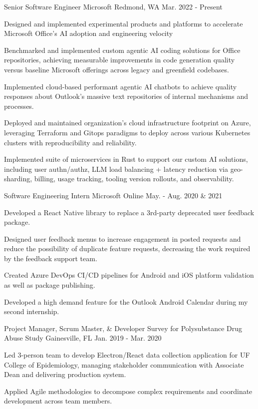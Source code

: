 \begin{cventries}
  \cventry
    {Senior Software Engineer}
    {Microsoft}
    {Redmond, WA}
    {Mar. 2022 - Present}
    {
      \begin{cvitems}
        \item{Designed and implemented experimental products and platforms to accelerate Microsoft Office's AI adoption and engineering velocity}
        \item{Benchmarked and implemented custom agentic AI coding solutions for Office repositories, achieving measurable improvements in code generation quality versus baseline Microsoft offerings across legacy and greenfield codebases.}
        \item{Implemented cloud-based performant agentic AI chatbots to achieve quality responses about Outlook's massive text repositories of internal mechanisms and processes.}
        \item{Deployed and maintained organization's cloud infrastructure footprint on Azure, leveraging Terraform and Gitops paradigms to deploy across various Kubernetes clusters with reproducibility and reliability.}
        \item{Implemented suite of microservices in Rust to support our custom AI solutions, including user authn/authz, LLM load balancing + latency reduction via geo-sharding, billing, usage tracking, tooling version rollouts, and observability.}
      \end{cvitems}
    }
  \cventry
    {Software Engineering Intern}
    {Microsoft}
    {Online}
    {May. - Aug. 2020 \& 2021}
    {
      \begin{cvitems}
        \item{Developed a React Native library to replace a 3rd-party deprecated user feedback package.}
        \item{Designed user feedback menus to increase engagement in posted requests and reduce the possibility of duplicate feature requests, decreasing the work required by the feedback support team.}
        \item{Created Azure DevOps CI/CD pipelines for Android and iOS platform validation as well as package publishing.}
        \item{Developed a high demand feature for the Outlook Android Calendar during my second internship.}
      \end{cvitems}
    }
  \cventry
    {Project Manager, Scrum Master, \& Developer}
    {Survey for Polysubstance Drug Abuse Study}
    {Gainesville, FL}
    {Jan. 2019 - Mar. 2020}
    {
      \begin{cvitems}
        \item {Led 3-person team to develop Electron/React data collection application for UF College of Epidemiology, managing stakeholder communication with Associate Dean and delivering production system.}
        \item {Applied Agile methodologies to decompose complex requirements and coordinate development across team members.}
      \end{cvitems}
    }
\end{cventries}

